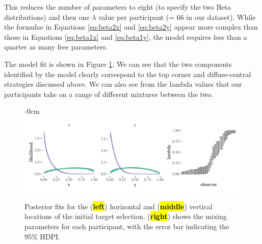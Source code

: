 \documentclass[vision,article,accept,pdftex,moreauthors]{Definitions/mdpi}
\begin{document}
This reduces the number of parameters to eight (to specify the two Beta distributions) and then one $\lambda$ value per participant (= 66 in our dataset). While the formulae in Equations \eqref{eq:beta2x} and \eqref{eq:beta2y} appear more complex than those in Equations \eqref{eq:beta1x} and \eqref{eq:beta1y}, the model requires less than a quarter as many free parameters. 

The model fit is shown in Figure \ref{fig:qjep_init2_sel_mdl}. We can see that the two components identified by the model clearly correspond to the top corner and diffuse-central strategies discussed above. We can also see from the lambda values that our participants take on a range of different mixtures between the two. 
\vspace{-12pt}
\begin{figure}[H]
\begin{adjustwidth}{-\extralength}{0cm}%
\centering
\includegraphics[width=1.3\textwidth]{Figures/init_sel2_mdl.pdf}
\end{adjustwidth}
\caption{Posterior fits for the ({\textbf{\hl{left}}}) horizontal and ({\textbf{\hl{middle}}}) vertical locations of the initial target selection. ({\textbf{\hl{right}}}) shows the mixing parameters for each participant, with the error bar indicating the $95\%$ HDPI.}%

\label{fig:qjep_init2_sel_mdl}
\end{figure} 
\end{document}
